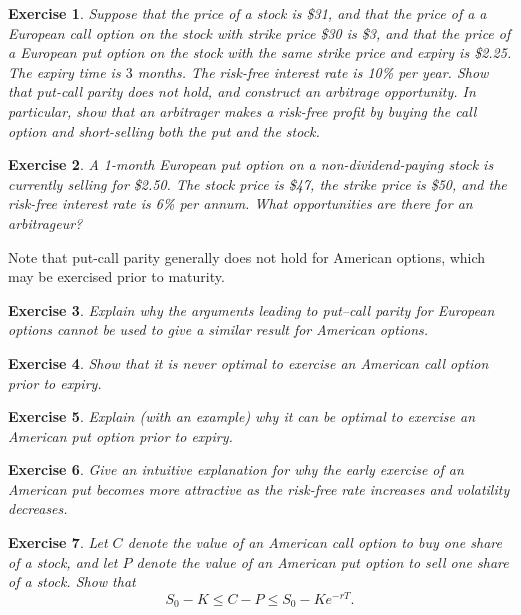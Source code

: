 \documentclass[letterpaper,10pt]{article}
\newtheorem{ex}{Exercise}
\begin{document}
\begin{ex}
Suppose that the price of a stock is \$31, and that the price of a a European call option on the stock with strike price \$30 is \$3, and that the price of a European put option on the stock with the same strike price and expiry is \$2.25.  The expiry time is $3$ months.  The risk-free interest rate is 10\% per year.  Show that put-call parity does not hold, and construct an arbitrage opportunity.  In particular, show that an arbitrager makes a risk-free profit by buying the call option and short-selling both the put and the stock.  
\end{ex}



\begin{ex}
A 1-month European put option on a non-dividend-paying stock is currently selling for \$2.50. The stock price is \$47, the strike price is \$50, and the risk-free interest rate is 6\% per annum. What opportunities are there for an arbitrageur?
\end{ex}





\noindent Note that put-call parity generally does not hold for American options, which may be exercised prior to maturity.



\begin{ex}
Explain why the arguments leading to put–call parity for European options cannot be used to give a similar result for American options.
\end{ex}



\begin{ex}
Show that it is never optimal to exercise an American call option prior to expiry.
\end{ex}



\begin{ex}
Explain (with an example) why it can be optimal to exercise an American put option prior to expiry.
\end{ex}



\begin{ex}
Give an intuitive explanation for why the early exercise of an American put becomes more attractive as the risk-free rate increases and volatility decreases.
\end{ex}


\begin{ex}
Let $C$ denote the value of an American call option to buy one share of a stock, and let $P$ denote the value of an American put option to sell one share of a stock.  Show that $$S_0-K\leq C-P\leq S_0-Ke^{-rT}.$$
\end{ex}
\end{document}
